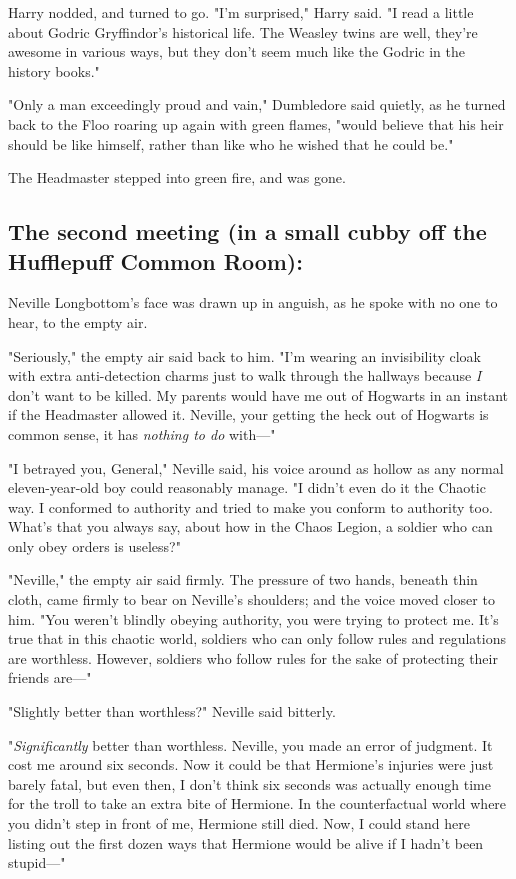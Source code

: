 Harry nodded, and turned to go. "I'm surprised," Harry said. "I read a little
about Godric Gryffindor's historical life. The Weasley twins are{\el} well,
they're awesome in various ways, but they don't seem much like the Godric in
the history books."

"Only a man exceedingly proud and vain," Dumbledore said quietly, as he turned
back to the Floo roaring up again with green flames, "would believe that his
heir should be like himself, rather than like who he wished that he could be."

The Headmaster stepped into green fire, and was gone.
\sbreak
\subsection{The second meeting (in a small cubby off the Hufflepuff Common Room):}

Neville Longbottom's face was drawn up in anguish, as he spoke with no one to
hear, to the empty air.

"Seriously," the empty air said back to him. "I'm wearing an invisibility cloak
with extra anti-detection charms just to walk through the hallways because
\emph{I} don't want to be killed. My parents would have me out of Hogwarts in
an instant if the Headmaster allowed it. Neville, your getting the heck out of
Hogwarts is common sense, it has \emph{nothing to do} with---"

"I betrayed you, General," Neville said, his voice around as hollow as any
normal eleven-year-old boy could reasonably manage. "I didn't even do it the
Chaotic way. I conformed to authority and tried to make you conform to
authority too. What's that you always say, about how in the Chaos Legion, a
soldier who can only obey orders is useless?"

"Neville," the empty air said firmly. The pressure of two hands, beneath thin
cloth, came firmly to bear on Neville's shoulders; and the voice moved closer
to him. "You weren't blindly obeying authority, you were trying to protect me.
It's true that in this chaotic world, soldiers who can only follow rules and
regulations are worthless. However, soldiers who follow rules for the sake of
protecting their friends are---"

"Slightly better than worthless?" Neville said bitterly.

"\emph{Significantly} better than worthless. Neville, you made an error of
judgment. It cost me around six seconds. Now it could be that Hermione's
injuries were just barely fatal, but even then, I don't think six seconds was
actually enough time for the troll to take an extra bite of Hermione. In the
counterfactual world where you didn't step in front of me, Hermione still died.
Now, I could stand here listing out the first dozen ways that Hermione would be
alive if I hadn't been stupid---"

